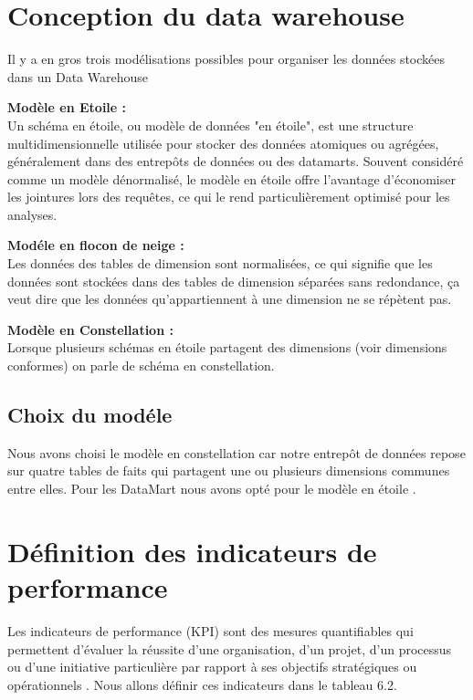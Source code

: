
\section{Conception du data warehouse}

Il y a en gros trois modélisations possibles pour organiser les données stockées dans un Data
Warehouse
\bigskip

\textbf{Modèle en Etoile :}\\
Un schéma en étoile, ou modèle de données "en étoile", est une structure multidimensionnelle utilisée pour stocker des données atomiques ou agrégées, généralement dans des
entrepôts de données ou des datamarts. Souvent considéré comme un modèle dénormalisé,
le modèle en étoile offre l’avantage d’économiser les jointures lors des requêtes, ce qui le
rend particulièrement optimisé pour les analyses.
\bigskip

\textbf{Modéle en flocon de neige :}\\
Les données des tables de dimension sont normalisées, ce qui signifie que les données
sont stockées dans des tables de dimension séparées sans redondance, ça veut dire que les
données qu’appartiennent à une dimension ne se répètent pas.

\bigskip
\textbf{Modèle en Constellation :}\\
Lorsque plusieurs schémas en étoile partagent des dimensions (voir dimensions conformes)
on parle de schéma en constellation.



\subsection{Choix du modéle}

Nous avons choisi le modèle en constellation car notre entrepôt de données repose sur
quatre tables de faits qui partagent une ou plusieurs dimensions communes entre elles. Pour les DataMart nous avons opté pour le modèle en étoile .






\section{Définition des indicateurs de performance}
Les indicateurs de performance (KPI) sont des mesures quantifiables qui permettent d’évaluer la réussite d’une organisation, d’un projet, d’un processus ou d’une initiative particulière
par rapport à ses objectifs stratégiques ou opérationnels . Nous allons définir ces indicateurs dans le tableau 6.2.


